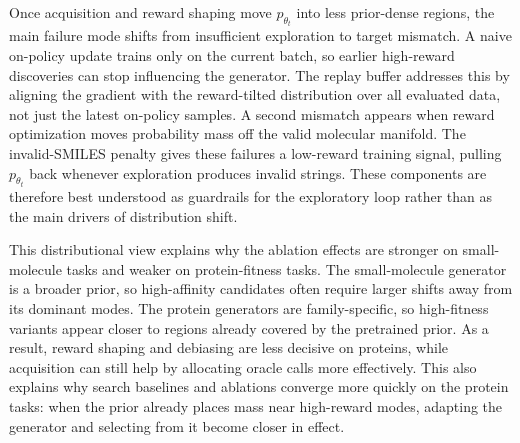 \documentclass{article}
\begin{document}
Once acquisition and reward shaping move $p_{\theta_t}$ into less prior-dense regions, the main failure mode shifts from insufficient exploration to target mismatch. A naive on-policy update trains only on the current batch, so earlier high-reward discoveries can stop influencing the generator. The replay buffer addresses this by aligning the gradient with the reward-tilted distribution over all evaluated data, not just the latest on-policy samples. A second mismatch appears when reward optimization moves probability mass off the valid molecular manifold. The invalid-SMILES penalty gives these failures a low-reward training signal, pulling $p_{\theta_t}$ back whenever exploration produces invalid strings. These components are therefore best understood as guardrails for the exploratory loop rather than as the main drivers of distribution shift.

This distributional view explains why the ablation effects are stronger on small-molecule tasks and weaker on protein-fitness tasks. The small-molecule generator is a broader prior, so high-affinity candidates often require larger shifts away from its dominant modes. The protein generators are family-specific, so high-fitness variants appear closer to regions already covered by the pretrained prior. As a result, reward shaping and debiasing are less decisive on proteins, while acquisition can still help by allocating oracle calls more effectively. This also explains why search baselines and ablations converge more quickly on the protein tasks: when the prior already places mass near high-reward modes, adapting the generator and selecting from it become closer in effect.
\end{document}
